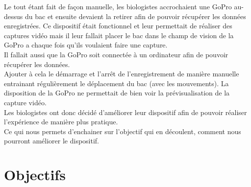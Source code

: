     \begin{flushleft}
        Le tout étant fait de façon manuelle, les biologistes accrochaient une GoPro au-dessus du bac et ensuite devaient la retirer afin de pouvoir récupérer les données enregistrées. Ce dispositif était fonctionnel et leur permettait de réaliser des captures vidéo mais il leur fallait placer le bac dans le champ de vision de la GoPro a chaque fois qu'ils voulaient faire une capture.\\[0.2cm]
        
        Il fallait aussi que la GoPro soit connectée à un ordinateur afin de pouvoir récupérer les données.\\[0.2cm]

        Ajouter à cela le démarrage et l'arrêt de l'enregistrement de manière manuelle entrainant régulièrement le déplacement du bac (avec les mouvements). La disposition de la GoPro ne permettait de bien voir la prévisualisation de la capture vidéo.\\[0.2cm]

        Les biologistes ont donc décidé d'améliorer leur dispositif afin de pouvoir réaliser l'expérience de manière plus pratique.\\[0.2cm]

        Ce qui nous permets d'enchainer sur l'objectif qui en découlent, comment nous pourront améliorer le dispositif.

    \end{flushleft}

    \vspace{0.1cm}


    \section{Objectifs}
    
